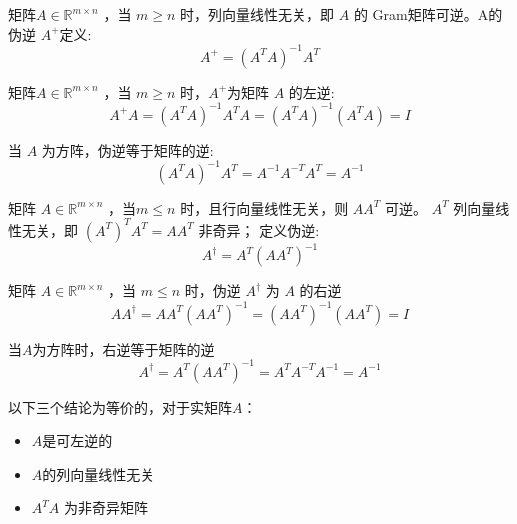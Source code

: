\begin{definition}
    矩阵$A \in \mathbb{R}^{m \times n} $ ，当 $ m \geq n $ 时，列向量线性无关，即 $ A $ 的 Gram矩阵可逆。A的伪逆 $ A^{+} $定义:
    $$
    A^{+}=\left(A^{T} A\right)^{-1} A^{T}
    $$

\end{definition}


\begin{theorem}
    矩阵$A \in \mathbb{R}^{m \times n} $ ，当 $ m \geq n $ 时，$ A^{+} $为矩阵 $ A $ 的左逆:
$$
A^{+} A=\left(A^{T} A\right)^{-1} A^{T} A=\left(A^{T} A\right)^{-1}\left(A^{T} A\right)=I
$$

\end{theorem}

\begin{theorem}
    当 $ A $ 为方阵，伪逆等于矩阵的逆:
$$
\left(A^{T} A\right)^{-1} A^{T}=A^{-1} A^{-T} A^{T}=A^{-1}
$$
\end{theorem}



\begin{definition}
    矩阵 $  {A} \in \mathbb{R}^{m \times n} $ ，当$m \leq  {n} $ 时，且行向量线性无关，则 $ A A^{T} $ 可逆。 $ A^{T} $ 列向量线性无关，即 $ \left(A^{T}\right)^{T} A^{T}= {A} A^{T} $ 非奇异；
定义伪逆:
$$
A^{\dagger}=A^{T}\left(A A^{T}\right)^{-1}
$$
\end{definition}

\begin{theorem}
    矩阵 $  {A} \in \mathbb{R}^{m \times n} $ ，当 $m \leq  {n} $ 时，伪逆 $ A^{\dagger} $ 为 $ A $ 的右逆
$$
A A^{\dagger}=A A^{T}\left(A A^{T}\right)^{-1}=\left(A A^{T}\right)^{-1}\left(A A^{T}\right)=I
$$
\end{theorem}

\begin{theorem}
    当$A$为方阵时，右逆等于矩阵的逆
$$
A^{\dagger}=A^{T}\left(A A^{T}\right)^{-1}=A^{T} A^{-T} A^{-1}=A^{-1}
$$
\end{theorem}

\begin{corollary}
    以下三个结论为等价的，对于实矩阵$A$：

    \begin{itemize}
        \item $A$是可左逆的
        \item $A$的列向量线性无关
        \item $ A^{T} A $ 为非奇异矩阵
    \end{itemize}
\end{corollary}

